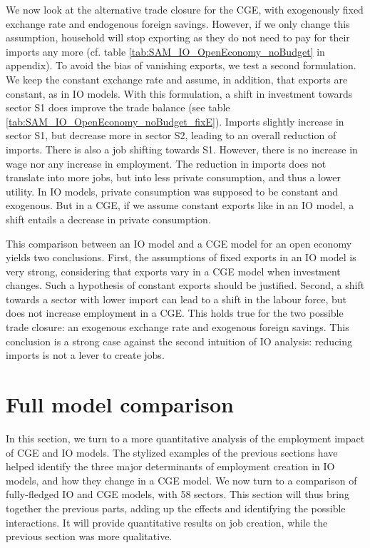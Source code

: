 We now look at the alternative trade closure for the CGE, with exogenously fixed exchange rate and endogenous foreign savings. However, if we only change this assumption, household will stop exporting as they do not need to pay for their imports any more (cf. table \ref{tab:SAM_IO_OpenEconomy_noBudget} in appendix). 
To avoid the bias of vanishing exports, we test a second formulation. We keep the constant exchange rate and assume, in addition, that exports are constant, as in IO models. With this formulation, a shift in investment towards sector S1 does improve the trade balance (see table \ref{tab:SAM_IO_OpenEconomy_noBudget_fixE}). 
Imports slightly increase in sector S1, but decrease more in sector S2, leading to an overall reduction of imports. There is also a job shifting towards S1.
However, there is no increase in wage nor any increase in employment. The reduction in imports does not translate into more jobs, but into less private consumption, and thus a lower utility.
In IO models, private consumption was supposed to be constant and exogenous. But in a CGE, if we assume constant exports like in an IO model, a shift entails a decrease in private consumption.

This comparison between an IO model and a CGE model for an open economy yields two conclusions. 
First, the assumptions of fixed exports in an IO model is very strong, considering that exports vary in a CGE model when investment changes. Such a hypothesis of constant exports should be justified. 
Second, a shift towards a sector with lower import can lead to a shift in the labour force, but does not increase employment in a CGE. This holds true for the two possible trade closure: an exogenous exchange rate and exogenous foreign savings.
This conclusion is a strong case against the second intuition of IO analysis: reducing imports is not a lever to create jobs. 





\section{Full model comparison} \label{sec:fullModel}

In this section, we turn to a more quantitative analysis of the employment impact of CGE and IO models.
The stylized examples of the previous sections have helped identify the three major determinants of employment creation in IO models, and how they change in a CGE model.
We now turn to a comparison of fully-fledged IO and CGE models, with 58 sectors.
This section will thus bring together the previous parts, adding up the effects and identifying the possible interactions. It will provide quantitative results on job creation, while the previous section was more qualitative. 


